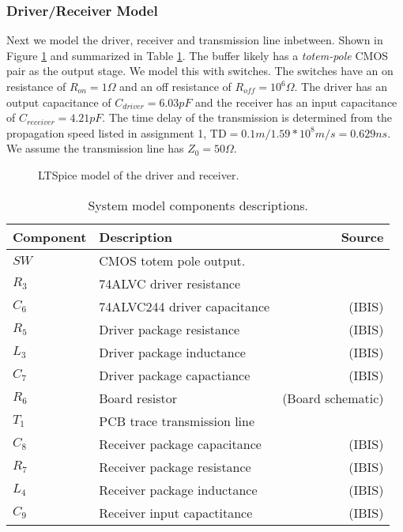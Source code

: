 \documentclass[../main.tex]{subfiles}
\begin{document}
\subsubsection{Driver/Receiver Model}

Next we model the driver, receiver and transmission line inbetween. Shown in Figure \ref{fig:driver} and summarized in Table \ref{tab:driver}. The buffer likely has a \textit{totem-pole} CMOS pair as the output stage. We model this with switches. The switches have an on resistance of $R_{on} = 1\si{\Omega}$ and an off resistance of $R_{off} = 10^6\si{\Omega}$. The driver has an output capacitance of $C_{driver} = 6.03\si{pF}$ and the receiver has an input capacitance of $C_{receiver} = 4.21\si{pF}$. The time delay of the transmission is determined from the propagation speed listed in assignment 1, $\text{TD} = 0.1 \si{m} / 1.59 * 10^8\si{m/s} = 0.629 \si{ns}$. We assume the transmission line has $Z_0 = 50\si{\Omega}$.

\begin{figure}[h]
    \centering
    \caption{LTSpice model of the driver and receiver.}
    \label{fig:driver}
\end{figure}

\newpage

\begin{table}[h]
    \centering
    \begin{tabular}{l|l r}
        \toprule[1pt]
        \textbf{Component} & \textbf{Description} & \textbf{Source}\\
        \midrule
        $SW$    & CMOS totem pole output.       & \\
        $R_3$   & 74ALVC driver resistance      & \\
        $C_6$   & 74ALVC244 driver capacitance  & (IBIS) \\
        $R_5$   & Driver package resistance     & (IBIS) \\
        $L_3$   & Driver package inductance     & (IBIS) \\
        $C_7$   & Driver package capactiance    & (IBIS) \\
        $R_6$   & Board resistor                & (Board schematic)\\
        $T_1$   & PCB trace transmission line   & \\
        $C_8$   & Receiver package capacitance  & (IBIS) \\
        $R_7$   & Receiver package resistance   & (IBIS) \\
        $L_4$   & Receiver package inductance   & (IBIS) \\
        $C_9$   & Receiver input capactitance   & (IBIS) \\
        \bottomrule[1pt]
    \end{tabular}
    \caption{System model components descriptions.}
    \label{tab:driver}
\end{table}
\end{document}
